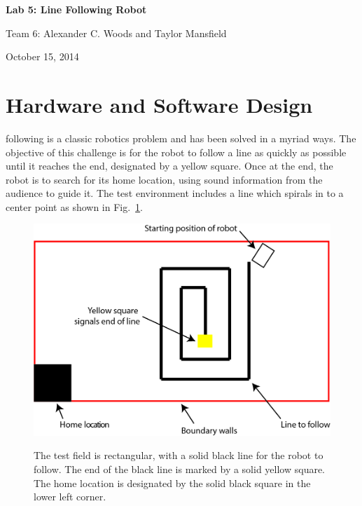 \documentclass[journal]{../IEEEtran}
\begin{document}
\begin{titlepage}
    \vspace*{\fill}
    \begin{center}
      {\LARGE \bf Lab 5: Line Following Robot}

      {Team 6: Alexander  C. Woods and Taylor Mansfield}

      October 15, 2014
    \end{center}
    \vspace*{\fill}
  \end{titlepage}


\section{Hardware and Software Design}\label{S.design}
 following is a classic robotics problem and has been solved in a myriad ways. The objective of this challenge is for the robot to follow a line as quickly as possible until it reaches the end, designated by a yellow square. Once at the end, the robot is to search for its home location, using sound information from the audience to guide it. The test environment includes a line which spirals in to a center point as shown in Fig.~\ref{F.field}.

\begin{figure}[ht]
 \centering
  \includegraphics[width=1\columnwidth]{field.jpg}\\
  \caption{The test field is rectangular, with a solid black line for the robot to follow. The end of the black line is marked by a solid yellow square. The home location is designated by the solid black square in the lower left corner.}
  \label{F.field}
\end{figure}
\end{document}

